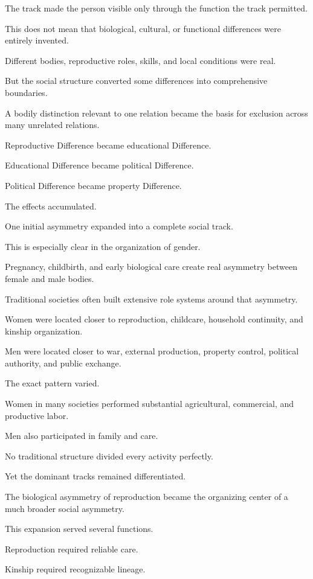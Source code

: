 The track made the person visible only through the function the track permitted.

This does not mean that biological, cultural, or functional differences were entirely invented.

Different bodies, reproductive roles, skills, and local conditions were real.

But the social structure converted some differences into comprehensive boundaries.

A bodily distinction relevant to one relation became the basis for exclusion across many unrelated relations.

Reproductive Difference became educational Difference.

Educational Difference became political Difference.

Political Difference became property Difference.

The effects accumulated.

One initial asymmetry expanded into a complete social track.

This is especially clear in the organization of gender.

Pregnancy, childbirth, and early biological care create real asymmetry between female and male bodies.

Traditional societies often built extensive role systems around that asymmetry.

Women were located closer to reproduction, childcare, household continuity, and kinship organization.

Men were located closer to war, external production, property control, political authority, and public exchange.

The exact pattern varied.

Women in many societies performed substantial agricultural, commercial, and productive labor.

Men also participated in family and care.

No traditional structure divided every activity perfectly.

Yet the dominant tracks remained differentiated.

The biological asymmetry of reproduction became the organizing center of a much broader social asymmetry.

This expansion served several functions.

Reproduction required reliable care.

Kinship required recognizable lineage.

